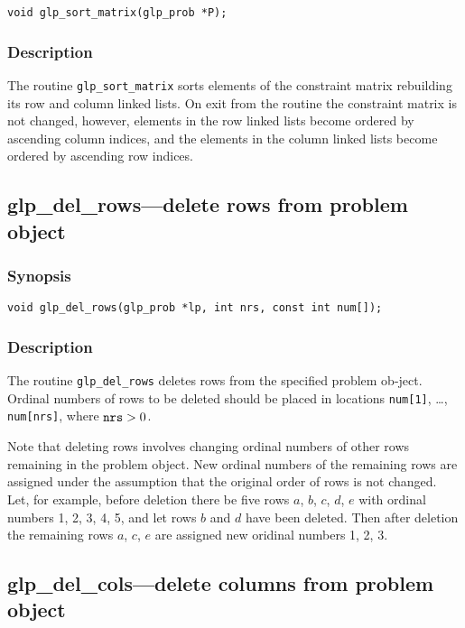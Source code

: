 \begin{verbatim}
void glp_sort_matrix(glp_prob *P);
\end{verbatim}

\subsubsection*{Description}

The routine \verb|glp_sort_matrix| sorts elements of the constraint
matrix rebuilding its row and column linked lists. On exit from the
routine the constraint matrix is not changed, however, elements in the
row linked lists become ordered by ascending column indices, and the
elements in the column linked lists become ordered by ascending row
indices.

\subsection{glp\_del\_rows---delete rows from problem object}

\subsubsection*{Synopsis}

\begin{verbatim}
void glp_del_rows(glp_prob *lp, int nrs, const int num[]);
\end{verbatim}

\subsubsection*{Description}

The routine \verb|glp_del_rows| deletes rows from the specified problem
ob-\linebreak ject. Ordinal numbers of rows to be deleted should be
placed in locations \verb|num[1]|, \dots, \verb|num[nrs]|, where
${\tt nrs}>0$.

Note that deleting rows involves changing ordinal numbers of other
rows remaining in the problem object. New ordinal numbers of the
remaining rows are assigned under the assumption that the original
order of rows is not changed. Let, for example, before deletion there
be five rows $a$, $b$, $c$, $d$, $e$ with ordinal numbers 1, 2, 3, 4, 5,
and let rows $b$ and $d$ have been deleted. Then after deletion the
remaining rows $a$, $c$, $e$ are assigned new oridinal numbers 1, 2, 3.

\subsection{glp\_del\_cols---delete columns from problem object}

